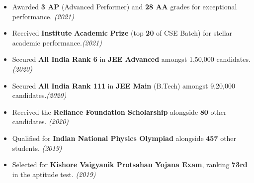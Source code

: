 \begin{itemize}[itemsep = -1.3 mm, leftmargin=*]
\item Awarded {\bf 3 AP} (Advanced Performer) and {\bf 28 AA} grades for exceptional performance. \hfill{\sl \small (2021)}
\item  Received {\bf Institute} {\bf Academic} {\bf Prize} (top {\bf 20} of CSE Batch) for stellar academic performance.\hfill{\sl \small (2021)}
\item  Secured \textbf{All India Rank 6} in {\bf JEE Advanced} amongst 1,50,000 candidates.\hfill{\sl \small (2020)}
\item  Secured \textbf{All India Rank 111} in {\bf JEE Main} (B.Tech) amongst 9,20,000 candidates.\hfill{\sl \small (2020)}
\item Received the {\bf Reliance Foundation Scholarship} alongside {\bf 80} other candidates. \hfill{\sl \small (2020)}
\item Qualified for {\bf Indian National Physics Olympiad} alongside {\bf 457} other students. \hfill{\sl \small (2019)}
\item Selected for {\bf Kishore Vaigyanik Protsahan Yojana Exam}, ranking {\bf 73rd} in the aptitude test. \hfill{\sl \small (2019)}
\end{itemize}